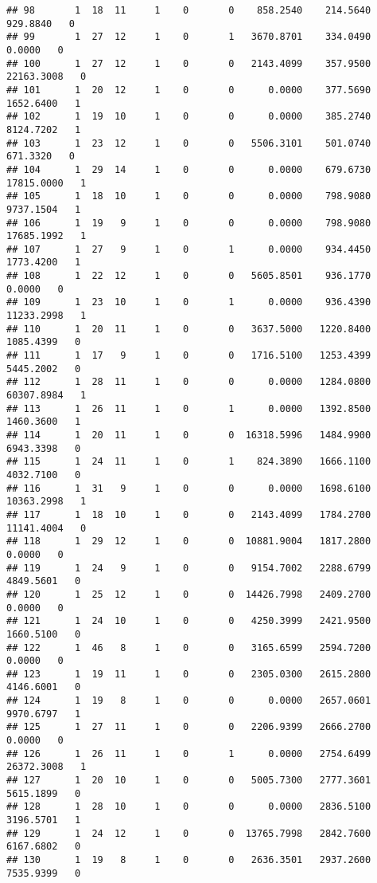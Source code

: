 \documentclass[
]{article}
\begin{document}
\begin{enumerate}
\begin{verbatim}
## 98       1  18  11     1    0       0    858.2540    214.5640    929.8840   0
## 99       1  27  12     1    0       1   3670.8701    334.0490      0.0000   0
## 100      1  27  12     1    0       0   2143.4099    357.9500  22163.3008   0
## 101      1  20  12     1    0       0      0.0000    377.5690   1652.6400   1
## 102      1  19  10     1    0       0      0.0000    385.2740   8124.7202   1
## 103      1  23  12     1    0       0   5506.3101    501.0740    671.3320   0
## 104      1  29  14     1    0       0      0.0000    679.6730  17815.0000   1
## 105      1  18  10     1    0       0      0.0000    798.9080   9737.1504   1
## 106      1  19   9     1    0       0      0.0000    798.9080  17685.1992   1
## 107      1  27   9     1    0       1      0.0000    934.4450   1773.4200   1
## 108      1  22  12     1    0       0   5605.8501    936.1770      0.0000   0
## 109      1  23  10     1    0       1      0.0000    936.4390  11233.2998   1
## 110      1  20  11     1    0       0   3637.5000   1220.8400   1085.4399   0
## 111      1  17   9     1    0       0   1716.5100   1253.4399   5445.2002   0
## 112      1  28  11     1    0       0      0.0000   1284.0800  60307.8984   1
## 113      1  26  11     1    0       1      0.0000   1392.8500   1460.3600   1
## 114      1  20  11     1    0       0  16318.5996   1484.9900   6943.3398   0
## 115      1  24  11     1    0       1    824.3890   1666.1100   4032.7100   0
## 116      1  31   9     1    0       0      0.0000   1698.6100  10363.2998   1
## 117      1  18  10     1    0       0   2143.4099   1784.2700  11141.4004   0
## 118      1  29  12     1    0       0  10881.9004   1817.2800      0.0000   0
## 119      1  24   9     1    0       0   9154.7002   2288.6799   4849.5601   0
## 120      1  25  12     1    0       0  14426.7998   2409.2700      0.0000   0
## 121      1  24  10     1    0       0   4250.3999   2421.9500   1660.5100   0
## 122      1  46   8     1    0       0   3165.6599   2594.7200      0.0000   0
## 123      1  19  11     1    0       0   2305.0300   2615.2800   4146.6001   0
## 124      1  19   8     1    0       0      0.0000   2657.0601   9970.6797   1
## 125      1  27  11     1    0       0   2206.9399   2666.2700      0.0000   0
## 126      1  26  11     1    0       1      0.0000   2754.6499  26372.3008   1
## 127      1  20  10     1    0       0   5005.7300   2777.3601   5615.1899   0
## 128      1  28  10     1    0       0      0.0000   2836.5100   3196.5701   1
## 129      1  24  12     1    0       0  13765.7998   2842.7600   6167.6802   0
## 130      1  19   8     1    0       0   2636.3501   2937.2600   7535.9399   0

\end{verbatim}
\end{enumerate}
\end{document}
